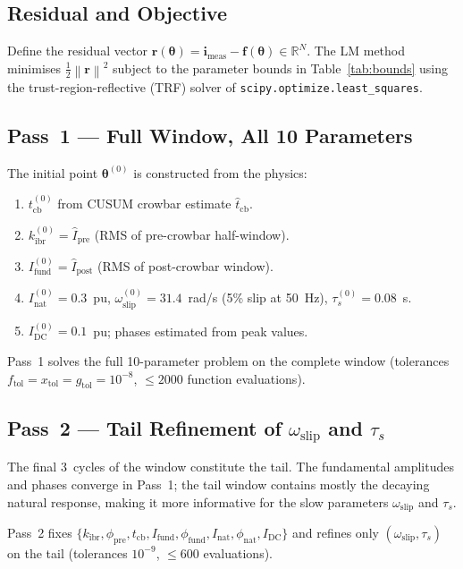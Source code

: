 \documentclass[11pt,a4paper]{article}
\newcommand{\vect}[1]{\boldsymbol{#1}}
\newcommand{\norm}[1]{\left\|#1\right\|}
\newcommand{\R}{\mathbb{R}}
\newcommand{\omegas}{\omega_{\text{slip}}}
\newcommand{\taus}{\tau_s}
\newcommand{\tcb}{t_{\text{cb}}}
\begin{document}
\subsection{Residual and Objective}

Define the residual vector $\vect{r}(\vect{\theta}) = \vect{i}_{\text{meas}}
- \vect{f}(\vect{\theta}) \in \R^N$.  The LM method minimises
$\tfrac{1}{2}\norm{\vect{r}}^2$ subject to the parameter bounds in
Table~\ref{tab:bounds} using the trust-region-reflective (TRF) solver of
\texttt{scipy.optimize.least\_squares}.

\subsection{Pass~1 — Full Window, All 10 Parameters}

The initial point $\vect{\theta}^{(0)}$ is constructed from the physics:

\begin{enumerate}
  \item $\tcb^{(0)}$ from CUSUM crowbar estimate $\hat{t}_{\text{cb}}$.
  \item $k_{\text{ibr}}^{(0)} = \hat{I}_{\text{pre}}$ (RMS of pre-crowbar
        half-window).
  \item $I_{\text{fund}}^{(0)} = \hat{I}_{\text{post}}$ (RMS of
        post-crowbar window).
  \item $I_{\text{nat}}^{(0)} = 0.3$~pu, $\omegas^{(0)} = 31.4$~rad/s
        (5\% slip at 50~Hz), $\taus^{(0)} = 0.08$~s.
  \item $I_{\text{DC}}^{(0)} = 0.1$~pu; phases estimated from peak values.
\end{enumerate}

Pass~1 solves the full 10-parameter problem on the complete window
(tolerances $f_{\text{tol}} = x_{\text{tol}} = g_{\text{tol}} = 10^{-8}$,
$\leq 2000$ function evaluations).

\subsection{Pass~2 — Tail Refinement of $\omegas$ and $\taus$}

The final 3~cycles of the window constitute the tail.  The fundamental
amplitudes and phases converge in Pass~1; the tail window contains mostly
the decaying natural response, making it more informative for the slow
parameters $\omegas$ and $\taus$.

Pass~2 fixes $\{k_{\text{ibr}}, \phi_{\text{pre}}, \tcb, I_{\text{fund}},
\phi_{\text{fund}}, I_{\text{nat}}, \phi_{\text{nat}}, I_{\text{DC}}\}$ and
refines only $(\omegas, \taus)$ on the tail (tolerances $10^{-9}$,
$\leq 600$ evaluations).
\end{document}
